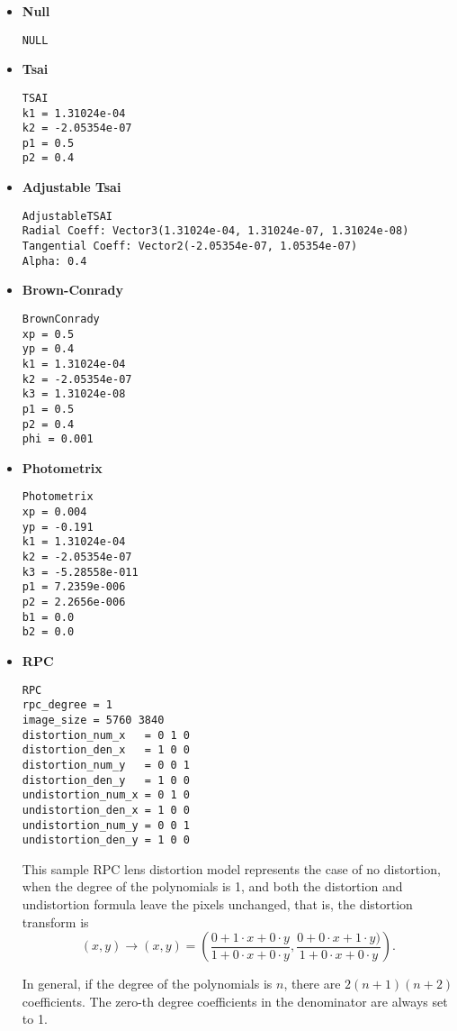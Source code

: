\begin{itemize}{}
\item  \textbf{Null}
\begin{verbatim}
NULL
\end{verbatim}

\item  \textbf{Tsai}
\begin{verbatim}
TSAI
k1 = 1.31024e-04
k2 = -2.05354e-07
p1 = 0.5
p2 = 0.4
\end{verbatim}

\item  \textbf{Adjustable Tsai}
\begin{verbatim}
AdjustableTSAI
Radial Coeff: Vector3(1.31024e-04, 1.31024e-07, 1.31024e-08)
Tangential Coeff: Vector2(-2.05354e-07, 1.05354e-07)
Alpha: 0.4
\end{verbatim}

\item  \textbf{Brown-Conrady}
\begin{verbatim}
BrownConrady
xp = 0.5
yp = 0.4
k1 = 1.31024e-04
k2 = -2.05354e-07
k3 = 1.31024e-08
p1 = 0.5
p2 = 0.4
phi = 0.001
\end{verbatim}

\item  \textbf{Photometrix}
\begin{verbatim}
Photometrix
xp = 0.004
yp = -0.191
k1 = 1.31024e-04
k2 = -2.05354e-07
k3 = -5.28558e-011
p1 = 7.2359e-006
p2 = 2.2656e-006
b1 = 0.0
b2 = 0.0
\end{verbatim}

\item  \textbf{RPC}

\begin{verbatim}
RPC
rpc_degree = 1
image_size = 5760 3840
distortion_num_x   = 0 1 0
distortion_den_x   = 1 0 0
distortion_num_y   = 0 0 1
distortion_den_y   = 1 0 0
undistortion_num_x = 0 1 0
undistortion_den_x = 1 0 0
undistortion_num_y = 0 0 1
undistortion_den_y = 1 0 0
\end{verbatim}

This sample RPC lens distortion model represents the case of no distortion, 
when the degree of the polynomials is 1, and both the distortion and undistortion 
formula leave the pixels unchanged, that is, the distortion transform is
\begin{equation*}
(x, y) \to (x, y) = \left(\frac{ 0 + 1\cdot x + 0\cdot y}{1 + 0\cdot x + 0\cdot y},
 \frac{0 + 0\cdot x + 1\cdot y)}{1 + 0\cdot x + 0\cdot y}\right).
\end{equation*}

In general, if the degree of the polynomials is $n$, there are $2(n+1)(n+2)$ coefficients. 
The zero-th degree coefficients in the denominator are always set to 1.

\end{itemize}{}

